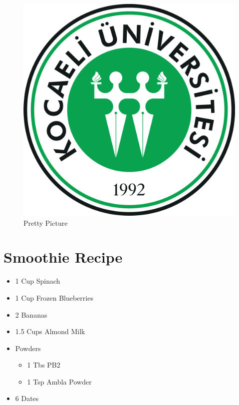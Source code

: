 \documentclass[a4paper,12pt]{book}
\begin{document}
\begin{figure}
    \centering
    \includegraphics[width=\linewidth]{pic.png}
    \caption{Pretty Picture}\label{fig:prettypic}
\end{figure}

\blindtext

\endgroup



\section[Smoothie]{Smoothie Recipe}

\begin{itemize}
    \item 1 Cup Spinach
    \item 1 Cup Frozen Blueberries
    \item 2 Bananas
    \item 1.5 Cups Almond Milk
    \item Powders
    \begin{itemize}
        \item 1 Tbs PB2
        \item 1 Tsp Ambla Powder
    \end{itemize}
    \item 6 Dates
\end{itemize}
\end{document}
